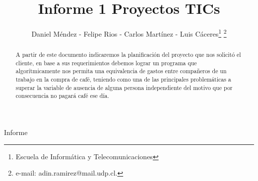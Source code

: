 \documentclass[twocolumn,11pts]{IEEEtran}
\begin{document}
\let\orilabel\label

%
\title{Informe 1 Proyectos TICs}
%

\author{Daniel Méndez - Felipe Rios - Carlos Martínez - Luis Cáceres\thanks{Escuela de Informática y Telecomunicaciones}%
\thanks{e-mail: adin.ramirez@mail.udp.cl.}%
}
% 
%


%
{Informe}%

\maketitle


\begin{abstract}
A partir de este documento indicaremos la planificación del proyecto que nos solicitó el cliente, en base a sus requerimientos debemos lograr un programa que algorítmicamente nos permita una equivalencia de gastos entre compañeros de un trabajo en la compra de café, teniendo como una de las principales problemáticas a superar la variable de ausencia de alguna persona independiente del motivo que por consecuencia no pagará café ese día.
\end{abstract}
\end{document}
